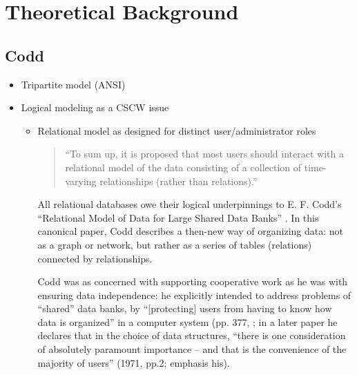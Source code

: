 \section{Theoretical Background}

\subsection{Codd}
\begin{itemize}
\item Tripartite model (ANSI)
\item Logical modeling as a CSCW issue
\begin{itemize}
\item Relational model as designed for distinct user/administrator roles

\begin{quote}
“To sum up, it is proposed that most users should interact with a relational model of the data consisting of a collection of time-varying relationships (rather than relations).”
\end{quote}

All relational databases owe their logical underpinnings to E. F. Codd’s “Relational Model of Data for Large Shared Data Banks” \cite{Codd_1970}. In this canonical paper, Codd describes a then-new way of organizing data: not as a graph or network, but rather as a series of tables (relations) connected by relationships.  

Codd was as concerned with supporting cooperative work as he was with ensuring data independence: he explicitly intended to address problems of “shared” data banks, by  “[protecting] users from having to know how data is organized” in a computer system (pp. 377, \cite{Codd_1970}; in a later paper he declares that in the choice of data structures,  “there is one consideration of absolutely paramount importance – and that is the convenience of the majority of users” (1971, pp.2; emphasis his). 


\end{itemize}
\end{itemize}

